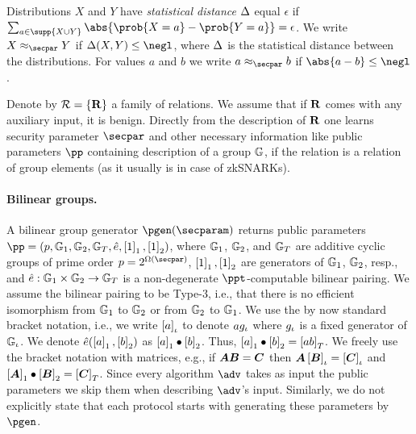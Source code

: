 \let\accentvec\vec \documentclass[runningheads,10pt]{llncs}
\def\vec#1{\mathchoice{\mbox{\boldmath$\displaystyle#1$}}
{\mbox{\boldmath$\textstyle#1$}} {\mbox{\boldmath$\scriptstyle#1$}}
{\mbox{\boldmath$\scriptscriptstyle#1$}}}
\begin{document}
Distributions $X$ and $Y$ have \emph{statistical distance} $\Delta$ equal
$\epsilon$ if $\sum_{a \in \supp{X \cup Y}} \abs{\prob{X = a} - \prob{Y = a}}
= \epsilon$.  We write $X \approx_\secpar Y$ if $\SD(X, Y) \leq \negl$, where
$\Delta$ is the statistical distance between the distributions.  For values $a$
and $b$ we write $a \approx_\secpar b$ if $\abs{a - b} \leq \negl$.

Denote by $\mathcal{R} = \{\mathbf{R}\}$ a family of relations. We assume that if
$\mathbf{R}$ comes with any auxiliary input, it is benign. Directly from the
description of $\mathbf{R}$ one learns security parameter $\secpar$ and other
necessary information like public parameters $\pp$ containing description of a
group $\mathbb{G}$, if the relation is a relation of group elements (as it usually
is in case of zkSNARKs).

\paragraph{Bilinear groups.}
A bilinear group generator $\pgen (\secparam)$ returns public parameters $ \pp
= (p, \GRP_1, \GRP_2, \GRP_T, \pair, \gone{1}, \gtwo{1})$, where $\mathbb{G}_1$,
$\mathbb{G}_2$, and $\mathbb{G}_T$ are additive cyclic groups of prime order $p =
2^{\Omega (\secpar)}$, $\left[1\right]_{1}, \left[1\right]_{2}$ are generators of $\mathbb{G}_1$,
$\mathbb{G}_2$, resp., and $\hat{e}: \mathbb{G}_1 \times \mathbb{G}_2 \to \mathbb{G}_T$ is a
non-degenerate $\ppt$-computable bilinear pairing.  We assume the bilinear
pairing to be Type-3, i.e., that there is no efficient isomorphism from
$\mathbb{G}_1$ to $\mathbb{G}_2$ or from $\mathbb{G}_2$ to $\mathbb{G}_1$.  We use the by now standard
bracket notation, i.e., we write $\left[a\right]_{\iota}$ to denote $a g_{\iota}$ where
$g_{\iota}$ is a fixed generator of $\mathbb{G}_{\iota}$.  We denote $\hat{e} (\left[a\right]_{1},
\left[b\right]_{2})$ as $\left[a\right]_{1} \bullet \left[b\right]_{2}$.  Thus, $\left[a\right]_{1} \bullet \left[b\right]_{2} =
\left[a b\right]_{T}$.  We freely use the bracket notation with matrices, e.g., if
$\vec{A} \vec{B} = \vec{C}$ then $\vec{A} \grpgi{\vec{B}} = \grpgi{\vec{C}}$
and $\gone{\vec{A}}\bullet \gtwo{\vec{B}} = \gtar{\vec{C}}$.
Since every algorithm $\adv$ takes as input the public parameters we
skip them when describing $\adv$'s input. Similarly, we do not explicitly
state that each protocol starts with generating these parameters by $\pgen$.
\end{document}

